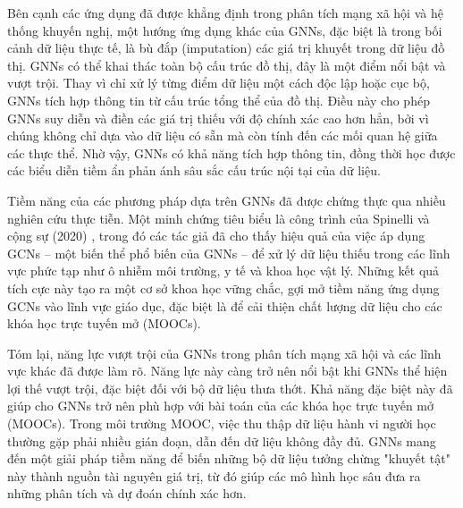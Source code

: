 Bên cạnh các ứng dụng đã được khẳng định trong phân tích mạng xã hội và hệ thống khuyến nghị, một hướng ứng dụng khác của GNNs, đặc biệt là trong bối cảnh dữ liệu thực tế, là bù đắp (imputation) các giá trị khuyết trong dữ liệu đồ thị. GNNs có thể khai thác toàn bộ cấu trúc đồ thị, đây là một điểm nổi bật và vượt trội. Thay vì chỉ xử lý từng điểm dữ liệu một cách độc lập hoặc cục bộ, GNNs tích hợp thông tin từ cấu trúc tổng thể của đồ thị. Điều này cho phép GNNs suy diễn và điền các giá trị thiếu với độ chính xác cao hơn hẳn, bởi vì chúng không chỉ dựa vào dữ liệu có sẵn mà còn tính đến các mối quan hệ giữa các thực thể. Nhờ vậy, GNNs có khả năng tích hợp thông tin, đồng thời học được các biểu diễn tiềm ẩn phản ánh sâu sắc cấu trúc nội tại của dữ liệu.

Tiềm năng của các phương pháp dựa trên GNNs đã được chứng thực qua nhiều nghiên cứu thực tiễn. Một minh chứng tiêu biểu là công trình của Spinelli và cộng sự (2020) \cite{spinelli2020missing}, trong đó các tác giả đã cho thấy hiệu quả của việc áp dụng GCNs – một biến thể phổ biến của GNNs – để xử lý dữ liệu thiếu trong các lĩnh vực phức tạp như ô nhiễm môi trường, y tế và khoa học vật lý. Những kết quả tích cực này tạo ra một cơ sở khoa học vững chắc, gợi mở tiềm năng ứng dụng GCNs vào lĩnh vực giáo dục, đặc biệt là để cải thiện chất lượng dữ liệu cho các khóa học trực tuyến mở (MOOCs).

Tóm lại, năng lực vượt trội của GNNs trong phân tích mạng xã hội và các lĩnh vực khác đã được làm rõ. Năng lực này càng trở nên nổi bật khi GNNs thể hiện lợi thế vượt trội, đặc biệt đối với bộ dữ liệu thưa thớt. Khả năng đặc biệt này đã giúp cho GNNs trở nên phù hợp với bài toán của các khóa học trực tuyến mở (MOOCs). Trong môi trường MOOC, việc thu thập dữ liệu hành vi người học thường gặp phải nhiều gián đoạn, dẫn đến dữ liệu không đầy đủ. GNNs mang đến một giải pháp tiềm năng để biến những bộ dữ liệu tưởng chừng "khuyết tật" này thành nguồn tài nguyên giá trị, từ đó giúp các mô hình học sâu đưa ra những phân tích và dự đoán chính xác hơn.


